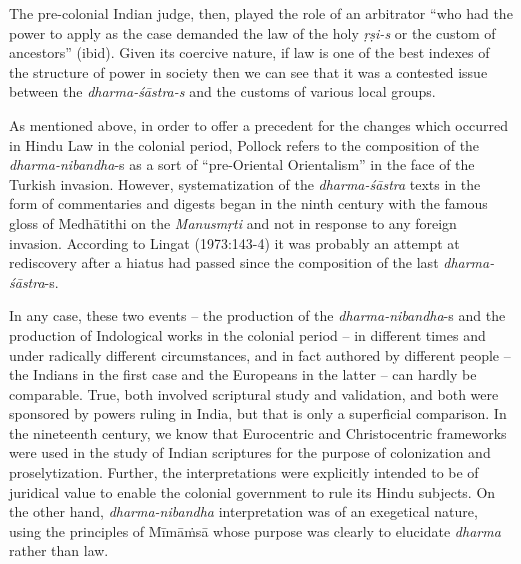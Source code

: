 The pre-colonial Indian judge, then, played the role of an arbitrator “who had the power to apply as the case demanded the law of the holy {\sl ṛṣi-s} or the custom of ancestors” (ibid). Given its coercive nature, if law is one of the best indexes of the structure of power in society then we can see that it was a contested issue between the {\sl dharma-śāstra-s} and the customs of various local groups.

As mentioned above, in order to offer a precedent for the changes which occurred in Hindu Law in the colonial period, Pollock refers to the composition of the {\sl dharma-nibandha}-s as a sort of “pre-Oriental Orientalism” in the face of the Turkish invasion. However, systematization of the {\sl dharma-śāstra} texts in the form of commentaries and digests began in the ninth century with the famous gloss of Medhātithi on the {\sl Manusmṛti} and not in response to any foreign invasion. According to Lingat (1973:143-4) it was probably an attempt at rediscovery after a hiatus had passed since the composition of the last {\sl dharma-śāstra}-s.

In any case, these two events – the production of the {\sl dharma-nibandha}-s and the production of Indological works in the colonial period – in different times and under radically different circumstances, and in fact authored by different people – the Indians in the first case and the Europeans in the latter – can hardly be comparable. True, both involved scriptural study and validation, and both were sponsored by powers ruling in India, but that is only a superficial comparison. In the nineteenth century, we know that Eurocentric and Christocentric frameworks were used in the study of Indian scriptures for the purpose of colonization and proselytization. Further, the interpretations were explicitly intended to be of juridical value to enable the colonial government to rule its Hindu subjects. On the other hand, {\sl dharma-nibandha} interpretation was of an exegetical nature, using the principles of Mīmāṁsā whose purpose was clearly to elucidate {\sl dharma} rather than law.


